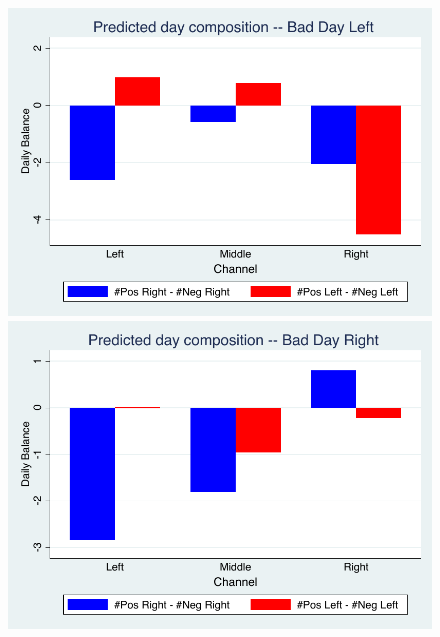 \documentclass[12pt]{article}
\begin{document}
	
	
	
	
	\begin{figure}[ht] 			
		\begin{minipage}[b]{0.5\linewidth}
			\centering
			\includegraphics[width=.9\linewidth]{figures/predicted_bad_left} 
			\vspace{4ex}
		\end{minipage}%
		\begin{minipage}[b]{0.5\linewidth}
			\centering
			\includegraphics[width=.9\linewidth]{figures/predicted_bad_right} 
			\vspace{4ex}
		\end{minipage} 
		\\
		\begin{minipage}[b]{0.5\linewidth}
			\centering

\end{minipage}
\end{figure}
\end{document}
